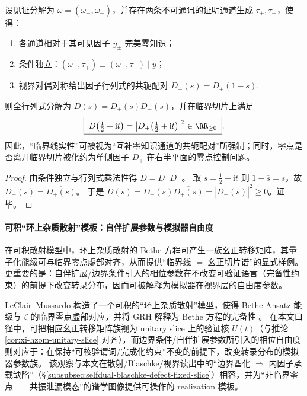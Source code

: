 \begin{proposition}\label{prop:xi-hzom-two-channel-modsquare}
设见证分解为 \(\omega=(\omega_{+},\omega_{-})\)，并存在两条不可通讯的证明通道生成 \(\tau_{+},\tau_{-}\)，使得：
\begin{enumerate}
  \item 各通道相对于其可见因子 \(y_{\pm}\) 完美零知识；
  \item 条件独立：\((\omega_{+},\tau_{+})\perp(\omega_{-},\tau_{-})\mid y\)；
  \item 视界对偶对称给出因子行列式的共轭配对
  \(
  D_{-}(s)=\overline{D_{+}(1-\overline{s})}.
  \)
\end{enumerate}
则全行列式分解为 \(D(s)=D_{+}(s)D_{-}(s)\)，并在临界切片上满足
\[
\boxed{\;
D\!\left(\tfrac12+\mathrm{i}t\right)=\left|D_{+}\!\left(\tfrac12+\mathrm{i}t\right)\right|^{2}\in\RR_{\ge 0}\; }.
\]
因此，“临界线实性”可被视为“互补零知识通道的共轭配对”所强制；同时，零点是否离开临界切片被化约为单侧因子 \(D_{+}\) 在右半平面的零点控制问题。
\end{proposition}

\begin{proof}
由条件独立与行列式乘法性得 \(D=D_{+}D_{-}\)。
取 \(s=\tfrac12+\mathrm{i}t\) 则 \(1-\overline{s}=s\)，故
\(
D_{-}(s)=\overline{D_{+}(s)}
\)。
于是 \(D(s)=D_{+}(s)\overline{D_{+}(s)}=|D_{+}(s)|^{2}\ge 0\)。证毕。
\end{proof}

\paragraph{可积“环上杂质散射”模板：自伴扩展参数与模拟器自由度}
在可积散射模型中，环上杂质散射的 Bethe 方程可产生一族幺正转移矩阵，其量子化能级可与临界零点虚部对齐，从而提供“临界线 \(=\) 幺正切片谱”的显式样例。
更重要的是：自伴扩展/边界条件引入的相位参数在不改变可验证语言（完备性约束）的前提下改变转录分布，因而可被解释为模拟器在视界层的自由度参数。

\begin{remark}\label{rem:xi-hzom-impurity-scattering-simulator-freedom}
LeClair--Mussardo 构造了一个可积的“环上杂质散射”模型，使得 Bethe Ansatz 能级与 \(\zeta\) 的临界零点虚部对应，并将 GRH 解释为 Bethe 方程的完备性 \cite{LeClairMussardo2024RiemannZerosImpurities}。
在本文口径中，可把相应幺正转移矩阵族视为 unitary slice 上的验证核 \(U(t)\)（与推论 \ref{cor:xi-hzom-unitary-slice} 对齐），而边界条件/自伴扩展参数所引入的相位自由度则对应于：在保持“可核验谓词/完成化约束”不变的前提下，改变转录分布的模拟器参数族。
该观察与本文在散射/Blaschke/视界读出中的“边界酉化 \(\Rightarrow\) 内因子承载缺陷”（\S\ref{subsubsec:selfdual-blaschke-defect-fixed-slice}）相容，并为“非临界零点 \(=\) 共振泄漏模态”的谱学图像提供可操作的 realization 模板。
\end{remark}

